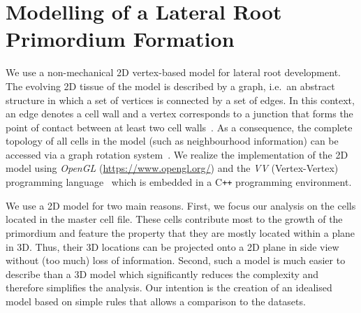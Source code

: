 \documentclass[11pt,a4paper, final]{article}
\begin{document}
\section{Modelling of a Lateral Root Primordium Formation}
\noindent
We use a non-mechanical 2D vertex-based model for lateral root development. The evolving 2D tissue of the model is described by a graph, i.e.~an abstract structure in which a set of vertices is connected by a set of edges. In this context, an edge denotes a cell wall and a vertex corresponds to a junction that forms the point of contact between at least two cell walls~\cite{prusinkiewicz_lindenmayer_1990, prusinkiewicz_runions_2012}. As a consequence, the complete topology of all cells in the model (such as neighbourhood information) can be accessed via a graph rotation system~\cite{edmonds_1960}. We realize the implementation of the 2D model using \textit{OpenGL} (\href{https://www.opengl.org/}{https://www.opengl.org/}) and the \textit{VV} (Vertex-Vertex) programming language~\cite{smith_et_al_2004, smith_2006} which is embedded in a C{}\verb!++! programming environment.


We use a 2D model for two main reasons. First, we focus our analysis on the cells located in the master cell file. These cells contribute most to the growth of the primordium and feature the property that they are mostly located within a plane in 3D. Thus, their 3D locations can be projected onto a 2D plane in side view without (too much) loss of information. Second, such a model is much easier to describe than a 3D model which significantly reduces the complexity and therefore simplifies the analysis. Our intention is the creation of an idealised model based on simple rules that allows a comparison to the datasets.
\end{document}
